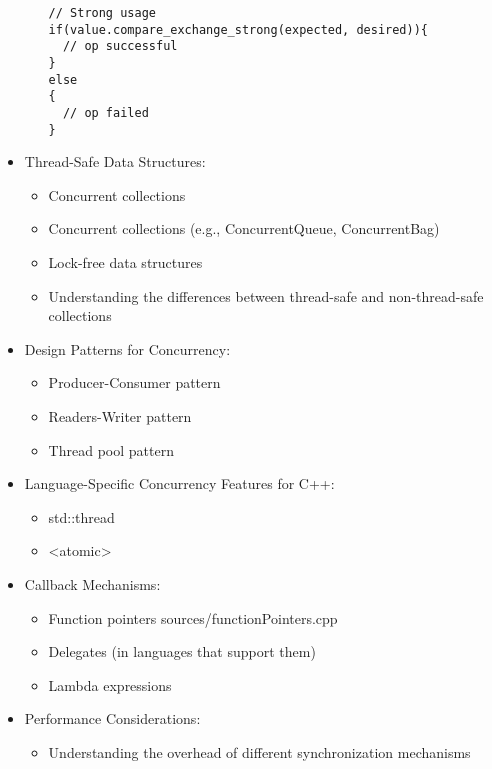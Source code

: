 \documentclass{article}
\begin{document}
\begin{itemize}
\begin{itemize}
\begin{lstlisting}[style=cpp]
// Strong usage
if(value.compare_exchange_strong(expected, desired)){
  // op successful
}
else
{
  // op failed
}
              \end{lstlisting}

          \end{itemize}
        \item Thread-Safe Data Structures:
          \begin{itemize}
            \item Concurrent collections
            \item Concurrent collections (e.g., ConcurrentQueue, ConcurrentBag)
            \item Lock-free data structures
            \item Understanding the differences between thread-safe and non-thread-safe collections
          \end{itemize}
        \item Design Patterns for Concurrency:
          \begin{itemize}
            \item Producer-Consumer pattern
            \item Readers-Writer pattern
            \item Thread pool pattern
          \end{itemize}
        \item Language-Specific Concurrency Features for C++:
          \begin{itemize}
            \item std::thread
            \item <atomic>
          \end{itemize}
        \item Callback Mechanisms:
          \begin{itemize}
            \item Function pointers
               {sources/functionPointers.cpp}
            \item Delegates (in languages that support them)
            \item Lambda expressions
          \end{itemize}
        \item Performance Considerations:
          \begin{itemize}
            \item Understanding the overhead of different synchronization mechanisms \\

\end{itemize}
\end{itemize}
\end{document}
